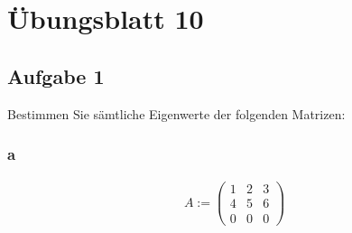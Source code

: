 \chapter{Übungsblatt 10}

\section{Aufgabe 1}

Bestimmen Sie sämtliche Eigenwerte der folgenden Matrizen:

\subsection{a}

\begin{align*}
    A := \begin{pmatrix}
        1 & 2 & 3 \\
        4 & 5 & 6 \\ 
        0 & 0 & 0
    \end{pmatrix}
\end{align*}

